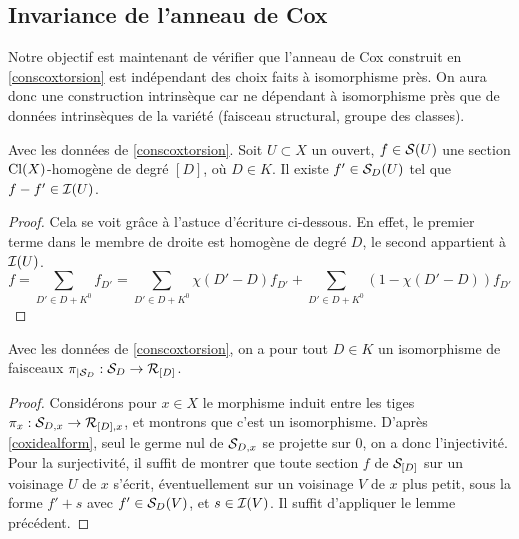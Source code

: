 \subsection{Invariance de l'anneau de Cox}

Notre objectif est maintenant de vérifier que l'anneau de Cox construit en \ref{conscoxtorsion} est indépendant des choix faits à isomorphisme près. On aura donc une construction intrinsèque car ne dépendant à isomorphisme près que de données intrinsèques de la variété (faisceau structural, groupe des classes).

\begin{lem}\label{LemmeCoxRelevelement}
Avec les données de \ref{conscoxtorsion}. Soit $U\subset X$ un ouvert, $f\in \mathcal{S}(U)$ une section $\operatorname{Cl}(X)$-homogène de degré $[D]$, où $D\in K$. Il existe $f'\in \mathcal{S}_D(U)$ tel que $f-f'\in\mathcal{I}(U)$.
\end{lem}
\begin{proof}
Cela se voit grâce à l'astuce d'écriture ci-dessous. En effet, le premier terme dans le membre de droite est homogène de degré $D$, le second appartient à $\mathcal{I}(U)$.
$$f=\sum_{D'\in D+K^0}f_{D'}=\sum_{D'\in D+K^0}\chi(D'-D)f_{D'}+ \sum_{D'\in D+K^0}(1-\chi(D'-D))f_{D'}$$
\end{proof}


\begin{prop}\label{coxsheafiso2}
Avec les données de \ref{conscoxtorsion}, on a pour tout $D\in K$ un isomorphisme de faisceaux $\pi_{|\mathcal{S}_D}:\mathcal{S}_D\rightarrow \mathcal{R}_{[D]}$.
\end{prop}
\begin{proof}
Considérons pour $x\in X$ le morphisme induit entre les tiges $\pi_x:\mathcal{S}_{D,x}\rightarrow \mathcal{R}_{[D],x}$, et montrons que c'est un isomorphisme. D'après \ref{coxidealform}, seul le germe nul de $\mathcal{S}_{D,x}$ se projette sur $0$, on a donc l'injectivité. Pour la surjectivité, il suffit de montrer que toute section $f$ de $\mathcal{S}_{[D]}$ sur un voisinage $U$ de $x$ s'écrit, éventuellement sur un voisinage $V$ de $x$ plus petit, sous la forme $f'+s$ avec $f'\in \mathcal{S}_D(V)$, et $s\in \mathcal{I}(V)$. Il suffit d'appliquer le lemme précédent.
\end{proof}

